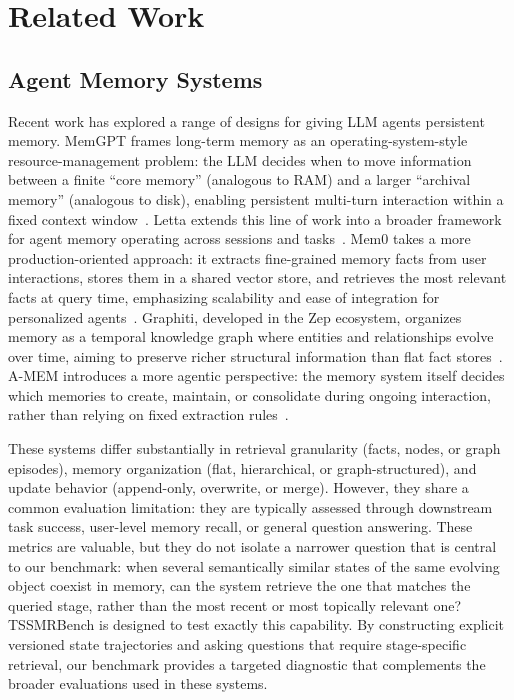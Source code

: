\section{Related Work}

\subsection{Agent Memory Systems}

Recent work has explored a range of designs for giving LLM agents persistent memory. MemGPT frames long-term memory as an operating-system-style resource-management problem: the LLM decides when to move information between a finite ``core memory'' (analogous to RAM) and a larger ``archival memory'' (analogous to disk), enabling persistent multi-turn interaction within a fixed context window~\cite{packer2023memgpt}. Letta extends this line of work into a broader framework for agent memory operating across sessions and tasks~\cite{packer2023memgpt}. Mem0 takes a more production-oriented approach: it extracts fine-grained memory facts from user interactions, stores them in a shared vector store, and retrieves the most relevant facts at query time, emphasizing scalability and ease of integration for personalized agents~\cite{mem02025}. Graphiti, developed in the Zep ecosystem, organizes memory as a temporal knowledge graph where entities and relationships evolve over time, aiming to preserve richer structural information than flat fact stores~\cite{rasmussen2025zep}. A-MEM introduces a more agentic perspective: the memory system itself decides which memories to create, maintain, or consolidate during ongoing interaction, rather than relying on fixed extraction rules~\cite{amem2025}.

These systems differ substantially in retrieval granularity (facts, nodes, or graph episodes), memory organization (flat, hierarchical, or graph-structured), and update behavior (append-only, overwrite, or merge). However, they share a common evaluation limitation: they are typically assessed through downstream task success, user-level memory recall, or general question answering. These metrics are valuable, but they do not isolate a narrower question that is central to our benchmark: when several semantically similar states of the same evolving object coexist in memory, can the system retrieve the one that matches the queried stage, rather than the most recent or most topically relevant one? TSSMRBench is designed to test exactly this capability. By constructing explicit versioned state trajectories and asking questions that require stage-specific retrieval, our benchmark provides a targeted diagnostic that complements the broader evaluations used in these systems.

